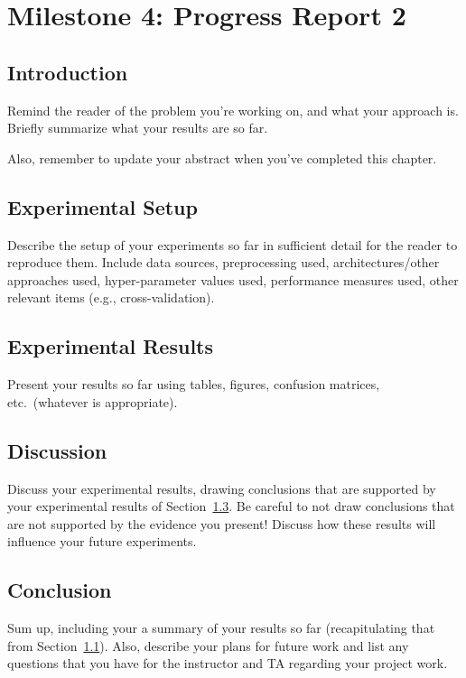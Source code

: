 \documentclass{report}
\begin{document}
\iffalse
\chapter{Milestone 4: Progress Report 2}


\section{Introduction}
\label{sec:M4-intro}

Remind the reader of the problem you're working on, and what your approach is.  Briefly summarize what your results are so far.

Also, remember to update your abstract when you've completed this chapter.

\section{Experimental Setup}
\label{sec:M3-setup}

Describe the setup of your experiments so far in sufficient detail for the reader to reproduce them.  Include data sources, preprocessing used, architectures/other approaches used, hyper-parameter values used, performance measures used, other relevant items (e.g., cross-validation).

\section{Experimental Results}
\label{sec:M4-results}

Present your results so far using tables, figures, confusion matrices, etc.\ (whatever is appropriate). 

\section{Discussion}

Discuss your experimental results, drawing conclusions that are supported by your experimental results of Section~\ref{sec:M4-results}.  Be careful to not draw conclusions that are not supported by the evidence you present! Discuss how these results will influence your future experiments.

\section{Conclusion}

Sum up, including your a summary of your results so far (recapitulating that from Section~\ref{sec:M4-intro}).  Also, describe your plans for future work and list any questions that you have for the instructor and TA regarding your project work.
\end{document}
